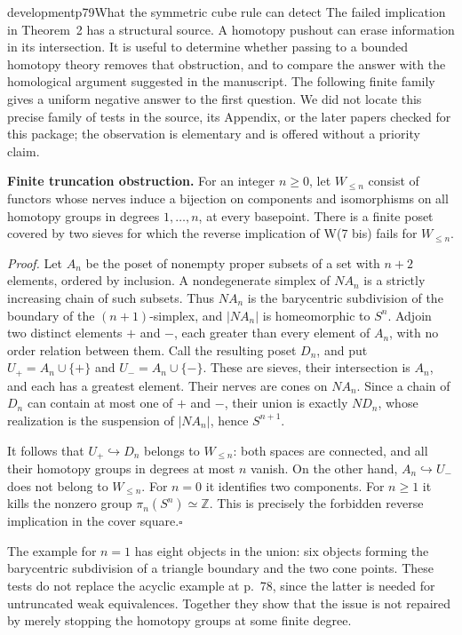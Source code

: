\begin{dcomment}{development}{p79}{What the symmetric cube rule can detect}
The failed implication in Theorem~2 has a structural source. A homotopy pushout can erase information in its intersection. It is useful to determine whether passing to a bounded homotopy theory removes that obstruction, and to compare the answer with the homological argument suggested in the manuscript. The following finite family gives a uniform negative answer to the first question. We did not locate this precise family of tests in the source, its Appendix, or the later papers checked for this package; the observation is elementary and is offered without a priority claim.

\textbf{Finite truncation obstruction.}\ours\quad
For an integer $n\geq0$, let $W_{\leq n}$ consist of functors whose nerves induce a bijection on components and isomorphisms on all homotopy groups in degrees $1,\ldots,n$, at every basepoint. There is a finite poset covered by two sieves for which the reverse implication of W(7 bis) fails for $W_{\leq n}$.

\emph{Proof.} Let $A_n$ be the poset of nonempty proper subsets of a set with $n+2$ elements, ordered by inclusion. A nondegenerate simplex of $NA_n$ is a strictly increasing chain of such subsets. Thus $NA_n$ is the barycentric subdivision of the boundary of the $(n+1)$-simplex, and $|NA_n|$ is homeomorphic to $S^n$. Adjoin two distinct elements $+$ and $-$, each greater than every element of $A_n$, with no order relation between them. Call the resulting poset $D_n$, and put $U_+=A_n\cup\{+\}$ and $U_-=A_n\cup\{-\}$. These are sieves, their intersection is $A_n$, and each has a greatest element. Their nerves are cones on $NA_n$. Since a chain of $D_n$ can contain at most one of $+$ and $-$, their union is exactly $ND_n$, whose realization is the suspension of $|NA_n|$, hence $S^{n+1}$.

It follows that $U_+\hookrightarrow D_n$ belongs to $W_{\leq n}$: both spaces are connected, and all their homotopy groups in degrees at most $n$ vanish. On the other hand, $A_n\hookrightarrow U_-$ does not belong to $W_{\leq n}$. For $n=0$ it identifies two components. For $n\geq1$ it kills the nonzero group $\pi_n(S^n)\simeq\mathbb Z$. This is precisely the forbidden reverse implication in the cover square.\hfill$\square$

The example for $n=1$ has eight objects in the union: six objects forming the barycentric subdivision of a triangle boundary and the two cone points. These tests do not replace the acyclic example at p.~78, since the latter is needed for untruncated weak equivalences. Together they show that the issue is not repaired by merely stopping the homotopy groups at some finite degree.


\end{dcomment}
